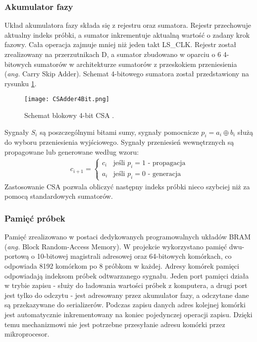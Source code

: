         \subsubsection{Akumulator fazy}
            Układ akumulatora fazy składa się z rejestru oraz sumatora. Rejestr przechowuje aktualny indeks próbki, a sumator 
            inkrementuje aktualną wartość o zadany krok fazowy. Cała operacja zajmuje mniej niż jeden takt LS\_CLK. 
            Rejestr został zrealizowany na przerzutnikach D, a sumator zbudowano w oparciu o 6 4-bitowych sumatorów w 
            architekturze sumatorów z przeskokiem przeniesienia (\textit{ang.} Carry Skip Adder). Schemat 4-bitowego sumatora 
            został przedstawiony na rysunku \ref{fig:CSA}. 
            \begin{figure}[!ht]
                \centering
                \texttt{[image: CSAdder4Bit.png]}
                \caption{Schemat blokowy 4-bit CSA \cite{wikipedia:CSA}.}
                \label{fig:CSA}
            \end{figure}
            Sygnały $S_i$ są poszczególnymi bitami sumy, sygnały pomocnicze 
            $p_i = a_i \oplus b_i$ służą do wyboru przeniesienia wyjściowego. Sygnały przeniesień wewnętrznych są propagowane lub 
            generowane według wzoru:
            \begin{align*}
                c_{i+1} =
                \begin{cases}
                    c_i &\text{jeśli } p_i = 1 \text{ - propagacja}\\
                    a_i &\text{jeśli } p_i = 0 \text{ - generacja}
                \end{cases}
            \end{align*}
            Zastosowanie CSA pozwala obliczyć następny indeks próbki nieco szybciej niż za pomocą standardowych sumatorów. 
            
        \subsubsection{Pamięć próbek}
            Pamięć zrealizowano w postaci dedykowanych programowalnych układów BRAM (\textit{ang.} Block Random-Access Memory). 
            W projekcie wykorzystano pamięć dwu-portową o 10-bitowej magistrali adresowej oraz 64-bitowych komórkach, co odpowiada 
            8192 komórkom po 8 próbkom w każdej. Adresy komórek pamięci odpowiadają indeksom próbek odtwarzanego sygnału. Jeden port pamięci 
            działa w trybie zapisu - służy do ładowania wartości próbek z komputera, 
            a drugi port jest tylko do odczytu - jest adresowany przez akumulator fazy, a odczytane dane są przekazywane do serializerów. 
            Podczas zapisu danych adres kolejnej komórki jest automatycznie inkrementowany na koniec pojedynczej operacji zapisu. Dzięki 
            temu mechanizmowi nie jest potrzebne przesyłanie adresu komórki przez mikroprocesor. 
